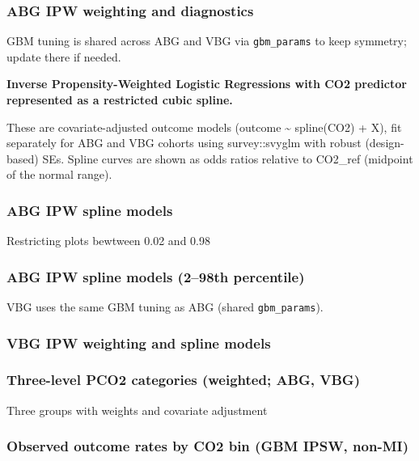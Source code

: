 \documentclass[
  11pt,
  letterpaper,
  DIV=11,
  numbers=noendperiod]{scrartcl}
\begin{document}
\subsubsection{ABG IPW weighting and
diagnostics}\label{abg-ipw-weighting-and-diagnostics}

GBM tuning is shared across ABG and VBG via \texttt{gbm\_params} to keep
symmetry; update there if needed.

\textbf{Inverse Propensity-Weighted Logistic Regressions with CO2
predictor represented as a restricted cubic spline.}

These are covariate-adjusted outcome models (outcome \textasciitilde{}
spline(CO2) + X), fit separately for ABG and VBG cohorts using
survey::svyglm with robust (design-based) SEs. Spline curves are shown
as odds ratios relative to CO2\_ref (midpoint of the normal range).

\subsubsection{ABG IPW spline models}\label{abg-ipw-spline-models}

Restricting plots bewtween 0.02 and 0.98

\subsubsection{ABG IPW spline models (2--98th
percentile)}\label{abg-ipw-spline-models-298th-percentile}

VBG uses the same GBM tuning as ABG (shared \texttt{gbm\_params}).

\subsubsection{VBG IPW weighting and spline
models}\label{vbg-ipw-weighting-and-spline-models}

\subsubsection{Three-level PCO2 categories (weighted; ABG,
VBG)}\label{three-level-pco2-categories-weighted-abg-vbg}

Three groups with weights and covariate adjustment

\subsubsection{Observed outcome rates by CO2 bin (GBM IPSW,
non-MI)}\label{observed-outcome-rates-by-co2-bin-gbm-ipsw-non-mi}
\end{document}
